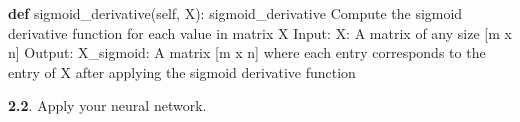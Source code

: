 \documentclass[
  letterpaper,
  DIV=11,
  numbers=noendperiod]{scrartcl}
\newenvironment{Shaded}{\begin{snugshade}}{\end{snugshade}}
\newcommand{\CommentTok}[1]{\textcolor[rgb]{0.37,0.37,0.37}{#1}}
\newcommand{\KeywordTok}[1]{\textcolor[rgb]{0.00,0.23,0.31}{\textbf{#1}}}
\newcommand{\NormalTok}[1]{\textcolor[rgb]{0.00,0.23,0.31}{#1}}
\newcommand{\VariableTok}[1]{\textcolor[rgb]{0.07,0.07,0.07}{#1}}
\begin{document}
\begin{Shaded}
\begin{Highlighting}[]
    \KeywordTok{def}\NormalTok{ sigmoid\_derivative(}\VariableTok{self}\NormalTok{, X):}
        \CommentTok{\textquotesingle{}\textquotesingle{}\textquotesingle{}sigmoid\_derivative}
\CommentTok{        Compute the sigmoid derivative function for each value in matrix X}
\CommentTok{            Input:}
\CommentTok{                X: A matrix of any size [m x n]}
\CommentTok{            Output:}
\CommentTok{                X\_sigmoid: A matrix [m x n] where each entry corresponds to the}
\CommentTok{                           entry of X after applying the sigmoid derivative }
\CommentTok{                           function}
\CommentTok{        \textquotesingle{}\textquotesingle{}\textquotesingle{}}
\end{Highlighting}
\end{Shaded}

\textbf{2.2}. Apply your neural network.
\end{document}
